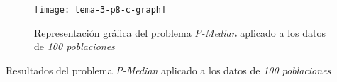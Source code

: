 \documentclass[spanish]{article}
\begin{document}
			\begin{figure}[h]
				\begin{center}
					\texttt{[image: tema-3-p8-c-graph]}
				\end{center}
				\caption{Representación gráfica del problema \emph{P-Median} aplicado a los datos de \emph{100 poblaciones}}
				\label{fig:sol-8c-graph}
			\end{figure}

			\begin{table}[h]
				\begin{center}
				\end{center}
				\caption{Resultados del problema \emph{P-Median} aplicado a los datos de \emph{100 poblaciones}}
				\label{table:sol-8c}
			\end{table}

	\nocite{subject:mio}
	\nocite{garciparedes:mosel-examples}
	
  
\end{document}
